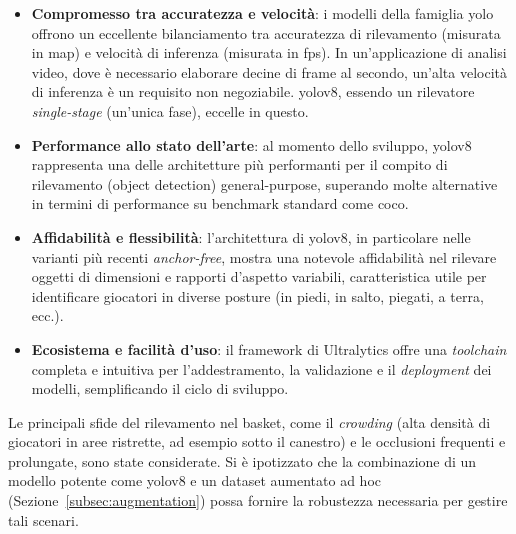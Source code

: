 \documentclass[12pt,a4paper,openright,twoside]{book}
\begin{document}
\begin{itemize}
  \item \textbf{Compromesso tra accuratezza e velocità}: i modelli della famiglia \ac{yolo} offrono un eccellente bilanciamento tra accuratezza 
  di rilevamento (misurata in \ac{map}) e velocità di inferenza (misurata in \ac{fps}). In un'applicazione di analisi video, dove è necessario 
  elaborare decine di frame al secondo, un'alta velocità di inferenza è un requisito non negoziabile. \ac{yolo}v8, essendo un rilevatore 
  \emph{single-stage} (un'unica fase), eccelle in questo. %
  \item \textbf{Performance allo stato dell'arte}: al momento dello sviluppo, \ac{yolo}v8 rappresenta una delle architetture più performanti 
  per il compito di rilevamento (object detection) general-purpose, superando molte alternative in termini di performance su benchmark standard come \ac{coco}.
  \item \textbf{Affidabilità e flessibilità}: l'architettura di \ac{yolo}v8, in particolare nelle varianti più recenti \emph{anchor-free}, mostra 
  una notevole affidabilità nel rilevare oggetti di dimensioni e rapporti d'aspetto variabili, caratteristica utile per identificare giocatori in 
  diverse posture (in piedi, in salto, piegati, a terra, ecc.). %
  \item \textbf{Ecosistema e facilità d'uso}: il framework di Ultralytics offre una \emph{toolchain} completa e intuitiva per l'addestramento, 
  la validazione e il \emph{deployment} dei modelli, semplificando il ciclo di sviluppo.
\end{itemize}

Le principali sfide del rilevamento nel basket, come il \emph{crowding} (alta densità di giocatori in aree ristrette, ad esempio sotto il canestro)
e le occlusioni frequenti e prolungate, sono state considerate. Si è ipotizzato che la combinazione di un modello potente come \ac{yolo}v8 e un 
dataset aumentato ad hoc (Sezione~\ref{subsec:augmentation}) possa fornire la robustezza necessaria per gestire tali scenari.
\end{document}
